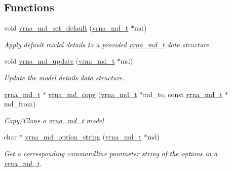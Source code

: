 \subsection*{Functions}
\begin{DoxyCompactItemize}
\item 
void \mbox{\hyperlink{group__model__details_ga8ac6ff84936282436f822644bf841f66}{vrna\+\_\+md\+\_\+set\+\_\+default}} (\mbox{\hyperlink{group__model__details_ga1f8a10e12a0a1915f2a4eff0b28ea17c}{vrna\+\_\+md\+\_\+t}} $\ast$md)
\begin{DoxyCompactList}\small\item\em Apply default model details to a provided \mbox{\hyperlink{group__model__details_ga1f8a10e12a0a1915f2a4eff0b28ea17c}{vrna\+\_\+md\+\_\+t}} data structure. \end{DoxyCompactList}\item 
void \mbox{\hyperlink{group__model__details_ga36ae40b8c3b82362f5798ad5b047b814}{vrna\+\_\+md\+\_\+update}} (\mbox{\hyperlink{group__model__details_ga1f8a10e12a0a1915f2a4eff0b28ea17c}{vrna\+\_\+md\+\_\+t}} $\ast$md)
\begin{DoxyCompactList}\small\item\em Update the model details data structure. \end{DoxyCompactList}\item 
\mbox{\hyperlink{group__model__details_ga1f8a10e12a0a1915f2a4eff0b28ea17c}{vrna\+\_\+md\+\_\+t}} $\ast$ \mbox{\hyperlink{group__model__details_ga619057a740918b5fb01808362bb67aea}{vrna\+\_\+md\+\_\+copy}} (\mbox{\hyperlink{group__model__details_ga1f8a10e12a0a1915f2a4eff0b28ea17c}{vrna\+\_\+md\+\_\+t}} $\ast$md\+\_\+to, const \mbox{\hyperlink{group__model__details_ga1f8a10e12a0a1915f2a4eff0b28ea17c}{vrna\+\_\+md\+\_\+t}} $\ast$md\+\_\+from)
\begin{DoxyCompactList}\small\item\em Copy/\+Clone a \mbox{\hyperlink{group__model__details_ga1f8a10e12a0a1915f2a4eff0b28ea17c}{vrna\+\_\+md\+\_\+t}} model. \end{DoxyCompactList}\item 
char $\ast$ \mbox{\hyperlink{group__model__details_ga3a7469f0725a849af6ba61a57dfd60ce}{vrna\+\_\+md\+\_\+option\+\_\+string}} (\mbox{\hyperlink{group__model__details_ga1f8a10e12a0a1915f2a4eff0b28ea17c}{vrna\+\_\+md\+\_\+t}} $\ast$md)
\begin{DoxyCompactList}\small\item\em Get a corresponding commandline parameter string of the options in a \mbox{\hyperlink{group__model__details_ga1f8a10e12a0a1915f2a4eff0b28ea17c}{vrna\+\_\+md\+\_\+t}}. \end{DoxyCompactList}\item 

\end{DoxyCompactItemize}
